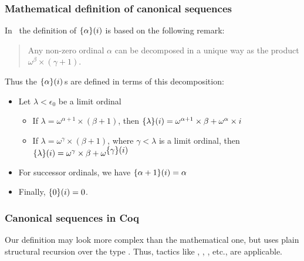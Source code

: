 \subsubsection{Mathematical definition of canonical sequences} 

In~\cite{KS81} the definition of $\mbox{$\{\alpha\}(i)$}$ is based on the following remark:
\begin{quote}
Any non-zero ordinal $\alpha$ can be decomposed in a unique way as the product
$\omega^\beta\times (\gamma+1)$.
\end{quote}

Thus the $\mbox{$\{\alpha\}(i)$}$\,s are defined in terms of this decomposition:
\begin{definition}
\label{def:canonseq-math}
  
\end{definition}
\begin{mathframe}
  \begin{itemize}
\item Let $\lambda<\epsilon_0$ be a limit ordinal 

\begin{itemize}
\item If $\lambda=\omega^{\alpha+1}\times (\beta+1)$, then 
$\mbox{$\{\lambda\}(i)$}= \omega^{\alpha+1}\times\beta +  \omega^\alpha \times i$
\item If $\lambda=\omega^{\gamma}\times (\beta+1)$, where $\gamma<\lambda$ is a limit ordinal, then 
$\mbox{$\{\lambda\}(i)$}=\omega^{\gamma}\times \beta + \omega^{\mbox{$\{\gamma\}(i)$}}$
\end{itemize}

\item For successor ordinals, we have $\mbox{$\{\alpha+1\}(i)$}= \alpha$ 

\item Finally, $\mbox{$\{0\}(i)$}= 0$.
\end{itemize}
\end{mathframe}

\subsubsection{Canonical sequences in Coq}

Our definition may look more complex than the mathematical one, but
uses plain structural recursion over the type . Thus, tactics like
, , , etc., are applicable. 


